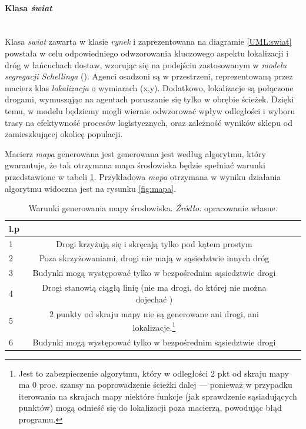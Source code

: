 \documentclass[polish, twoside, 12pt, a4paper]{article}
\theoremstyle{definition}
\theoremstyle{plain}
\theoremstyle{remark}
\begin{document}
\paragraph{Klasa \textit{świat}}\mbox{}\\

Klasa \textit{swiat} zawarta w klasie \textit{rynek} i zaprezentowana na diagramie \ref{UML:swiat} powstała w celu odpowiedniego odwzorowania kluczowego aspektu lokalizacji i dróg w łańcuchach dostaw, wzorując się na podejściu zastosowanym w \textit{modelu segregacji Schellinga} (\cite{Schelling1971}). Agenci osadzoni są w przestrzeni, reprezentowaną przez macierz klas \textit{lokalizacja} o wymiarach (x,y). Dodatkowo, lokalizacje są połączone drogami, wymusząjąc na agentach poruszanie się tylko w obrębie ścieżek. Dzięki temu, w modelu będziemy mogli wiernie odwzorować wpływ odległości i wyboru trasy na efektywność procesów logistycznych, oraz zależność wyników sklepu od zamieszkującej okolicę populacji. 

Macierz \textit{mapa} generowana jest generowana jest według algorytmu, który gwarantuje, że tak otrzymana mapa środowiska będzie spełniać warunki przedstawione w tabeli \ref{tab:warunki_drogi}. Przykładowa \textit{mapa} otrzymana w wyniku działania algorytmu widoczna jest na rysunku \ref{fig:mapa}.

\begin{table}[hbt]
  \centering
  \captionsetup{margin=10pt,font=small,labelfont=bf,width=.8\textwidth}
  \caption[Warunki generowania mapy środowiska]{Warunki generowania mapy środowiska. \textit{Źródło:} opracowanie własne.}
  \label{tab:warunki_drogi}
\vspace*{2ex}
  \begin{tabular}{lccc}
    l.p        &  \\ \hline
    1     &   Drogi krzyżują się i skręcają tylko pod kątem prostym  \\
    2        &    Poza skrzyżowaniami, drogi nie mają w sąsiedztwie innych dróg     \\
    3 &   Budynki mogą występować tylko w bezpośrednim sąsiedztwie drogi \\ 
    4 &   Drogi stanowią ciągłą linię (nie ma drogi, do której nie można dojechać ) \\ 
    5 &   2 punkty od skraju mapy nie są generowane ani drogi, ani lokalizacje.\footnote{Jest to zabezpieczenie algorytmu, który w odległości 2 pkt od skraju mapy ma 0 proc. szansy na poprowadzenie ścieżki dalej --- ponieważ w przypadku iterowania na skrajach mapy niektóre funkcje (jak sprawdzenie sąsiadujących punktów) mogą odnieść się do lokalizacji poza macierzą, powodując błąd programu.}\\ 
    6 &   Budynki mogą występować tylko w bezpośrednim sąsiedztwie drogi \\ 
  \end{tabular}
\end{table}
\end{document}
